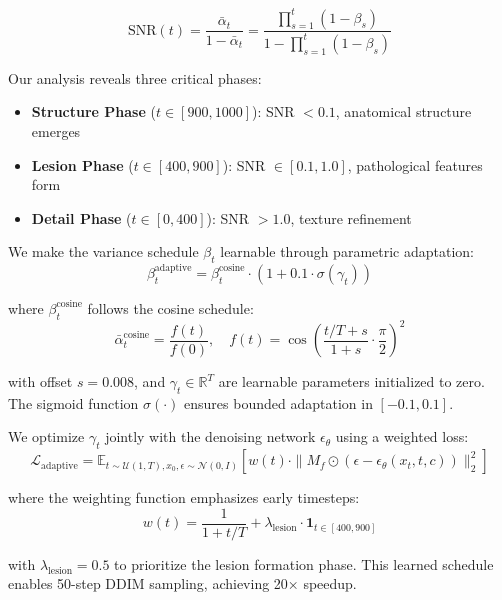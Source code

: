 \documentclass[10pt,twocolumn,letterpaper]{article}
\begin{document}
\begin{equation}
\text{SNR}(t) = \frac{\bar{\alpha}_t}{1-\bar{\alpha}_t} = \frac{\prod_{s=1}^t (1-\beta_s)}{1-\prod_{s=1}^t (1-\beta_s)}
\end{equation}

Our analysis reveals three critical phases:
\begin{itemize}
    \item \textbf{Structure Phase} ($t \in [900, 1000]$): SNR $< 0.1$, anatomical structure emerges
    \item \textbf{Lesion Phase} ($t \in [400, 900]$): SNR $\in [0.1, 1.0]$, pathological features form
    \item \textbf{Detail Phase} ($t \in [0, 400]$): SNR $> 1.0$, texture refinement
\end{itemize}

We make the variance schedule $\beta_t$ learnable through parametric adaptation:
\begin{equation}
\beta_t^{\text{adaptive}} = \beta_t^{\text{cosine}} \cdot (1 + 0.1 \cdot \sigma(\gamma_t))
\end{equation}

where $\beta_t^{\text{cosine}}$ follows the cosine schedule:
\begin{equation}
\bar{\alpha}_t^{\text{cosine}} = \frac{f(t)}{f(0)}, \quad f(t) = \cos\left(\frac{t/T + s}{1 + s} \cdot \frac{\pi}{2}\right)^2
\end{equation}

with offset $s = 0.008$, and $\gamma_t \in \mathbb{R}^T$ are learnable parameters initialized to zero. The sigmoid function $\sigma(\cdot)$ ensures bounded adaptation in $[-0.1, 0.1]$.

We optimize $\gamma_t$ jointly with the denoising network $\epsilon_\theta$ using a weighted loss:
\begin{equation}
\mathcal{L}_{\text{adaptive}} = \mathbb{E}_{t \sim \mathcal{U}(1,T), x_0, \epsilon \sim \mathcal{N}(0,I)}\left[w(t) \cdot \|M_f \odot (\epsilon - \epsilon_\theta(x_t, t, c))\|_2^2\right]
\end{equation}

where the weighting function emphasizes early timesteps:
\begin{equation}
w(t) = \frac{1}{1+t/T} + \lambda_{\text{lesion}} \cdot \mathbf{1}_{t \in [400, 900]}
\end{equation}

with $\lambda_{\text{lesion}} = 0.5$ to prioritize the lesion formation phase. This learned schedule enables 50-step DDIM sampling, achieving 20× speedup.
\end{document}
